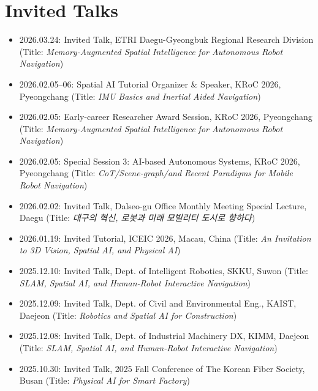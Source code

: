 \documentclass{cv} %
\begin{document}
\section{Invited Talks}
\begin{itemize}[label=$\cdot$]

    \item 2026.03.24: Invited Talk, ETRI Daegu-Gyeongbuk Regional Research Division
    \hfill (Title: \textit{Memory-Augmented Spatial Intelligence for Autonomous Robot Navigation})

    \item 2026.02.05--06: Spatial AI Tutorial Organizer \& Speaker, KRoC 2026, Pyeongchang
    \hfill (Title: \textit{IMU Basics and Inertial Aided Navigation})

    \item 2026.02.05: Early-career Researcher Award Session, KRoC 2026, Pyeongchang
    \hfill (Title: \textit{Memory-Augmented Spatial Intelligence for Autonomous Robot Navigation})

    \item 2026.02.05: Special Session 3: AI-based Autonomous Systems, KRoC 2026, Pyeongchang
    \hfill (Title: \textit{CoT/Scene-graph/and Recent Paradigms for Mobile Robot Navigation})

    \item 2026.02.02: Invited Talk, Dalseo-gu Office Monthly Meeting Special Lecture, Daegu
    \hfill (Title: \textit{\textsf{대구의 혁신, 로봇과 미래 모빌리티 도시로 향하다}})

    \item 2026.01.19: Invited Tutorial, ICEIC 2026, Macau, China
    \hfill (Title: \textit{An Invitation to 3D Vision, Spatial AI, and Physical AI})

    \item 2025.12.10: Invited Talk, Dept. of Intelligent Robotics, SKKU, Suwon
    \hfill (Title: \textit{SLAM, Spatial AI, and Human-Robot Interactive Navigation})

    \item 2025.12.09: Invited Talk, Dept. of Civil and Environmental Eng., KAIST, Daejeon
    \hfill (Title: \textit{Robotics and Spatial AI for Construction})

    \item 2025.12.08: Invited Talk, Dept. of Industrial Machinery DX, KIMM, Daejeon
    \hfill (Title: \textit{SLAM, Spatial AI, and Human-Robot Interactive Navigation})

    \item 2025.10.30: Invited Talk, 2025 Fall Conference of The Korean Fiber Society, Busan
    \hfill (Title: \textit{Physical AI for Smart Factory})


\end{itemize}
\end{document}
